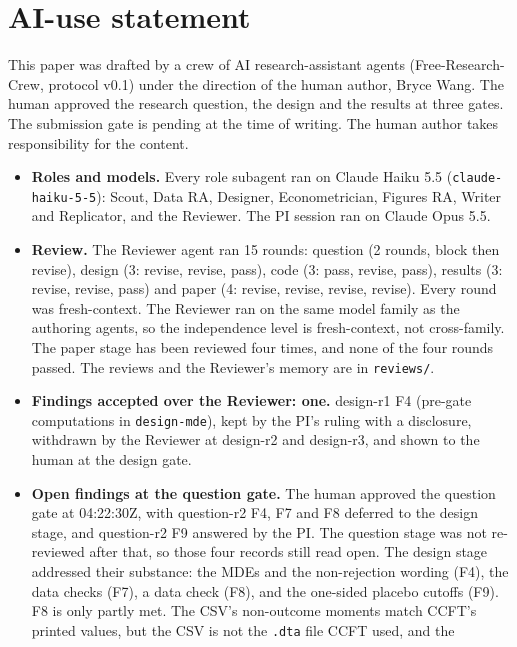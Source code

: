 \section*{AI-use statement}

This paper was drafted by a crew of AI research-assistant agents
(Free-Research-Crew, protocol v0.1) under the direction of the human author, Bryce Wang.
The human approved the research question, the design and the results at three gates.
The submission gate is pending at the time of writing. The human author takes
responsibility for the content.

\begin{itemize}
  \item \textbf{Roles and models.} Every role subagent ran on Claude Haiku 5.5
        (\texttt{claude-haiku-5-5}): Scout, Data RA, Designer, Econometrician, Figures RA,
        Writer and Replicator, and the Reviewer. The PI session ran on Claude Opus 5.5.
  \item \textbf{Review.} The Reviewer agent ran 15 rounds: question (2 rounds, block then
        revise), design (3: revise, revise, pass), code (3: pass, revise, pass), results
        (3: revise, revise, pass) and paper (4: revise, revise, revise, revise). Every round
        was fresh-context. The Reviewer ran on the same model family as the authoring agents,
        so the independence level is fresh-context, not cross-family. The paper stage has been
        reviewed four times, and none of the four rounds passed. The reviews and the
        Reviewer's memory are in \texttt{reviews/}.
  \item \textbf{Findings accepted over the Reviewer: one.} design-r1 F4 (pre-gate
        computations in \texttt{design-mde}), kept by the PI's ruling with a disclosure,
        withdrawn by the Reviewer at design-r2 and design-r3, and shown to the human at the
        design gate.
  \item \textbf{Open findings at the question gate.} The human approved the question gate at
        04:22:30Z, with question-r2 F4, F7 and F8 deferred to the design stage, and question-r2
        F9 answered by the PI. The question stage was not re-reviewed after that, so those four
        records still read open. The design stage addressed their substance: the MDEs and the
        non-rejection wording (F4), the data checks (F7), a data check (F8), and the one-sided
        placebo cutoffs (F9). F8 is only partly met. The CSV's non-outcome moments match
        CCFT's printed values, but the CSV is not the \texttt{.dta} file CCFT used, and the

\end{itemize}
